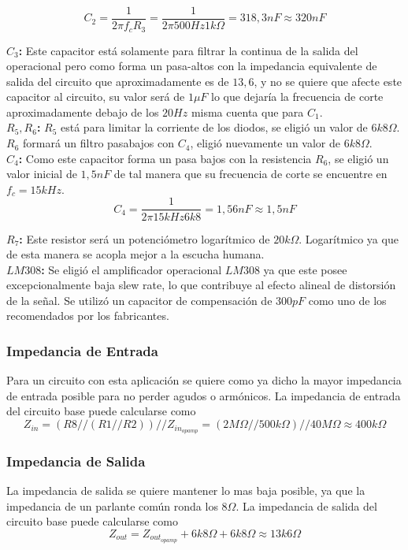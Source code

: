 \[ C_2 = \frac{1}{2\pi f_c R_3} = \frac{1}{2\pi 500Hz 1k\Omega} = 318,3nF \approx 320nF \]

\textbf{$C_3$:} Este capacitor está solamente para filtrar la continua de la salida del operacional pero como forma un pasa-altos con la impedancia equivalente de salida del circuito que aproximadamente es de $13,6$, y no se quiere que afecte este capacitor al circuito, su valor será de $1\mu F$ lo que dejaría la frecuencia de corte aproximadamente debajo de los $20Hz$ misma cuenta que para $C_1$.\\

\textbf{$R_5, R_6$:} $R_5$ está para limitar la corriente de los diodos, se eligió un valor de $6k8\Omega$. $R_6$ formará un filtro pasabajos con $C_4$, eligió nuevamente un valor de $6k8\Omega$.\\

\textbf{$C_4$:} Como este capacitor forma un pasa bajos con la resistencia $R_6$, se eligió un valor inicial de $1,5nF$ de tal manera que su frecuencia de corte se encuentre en $f_c = 15kHz$.
\[ C_4 = \frac{1}{2\pi 15kHz 6k8} = 1,56nF \approx 1,5nF\]

\textbf{$R_7$:} Este resistor será un potenciómetro logarítmico de $20k\Omega$. Logarítmico ya que de esta manera se acopla mejor a la escucha humana.\\

\textbf{$LM308$:} Se eligió el amplificador operacional $LM308$ ya que este posee excepcionalmente baja slew rate, lo que contribuye al efecto alineal de distorsión de la señal. Se utilizó un capacitor de compensación de $300pF$ como uno de los recomendados por los fabricantes. 

\subsubsection{Impedancia de Entrada}

Para un circuito con esta aplicación se quiere como ya dicho la mayor impedancia de entrada posible para no perder agudos o armónicos.
La impedancia de entrada del circuito base puede calcularse como
\[Z_{in} = (R8//(R1//R2))//Z_{in_{opamp}} = (2M\Omega // 500k\Omega)//40M\Omega \approx 400k\Omega\]

\subsubsection{Impedancia de Salida}

La impedancia de salida se quiere mantener lo mas baja posible, ya que la impedancia de un parlante común ronda los $8\Omega$.
La impedancia de salida del circuito base puede calcularse como
\[ Z_{out} = Z_{out_{opamp}} + 6k8\Omega + 6k8\Omega \approx 13k6\Omega \]

